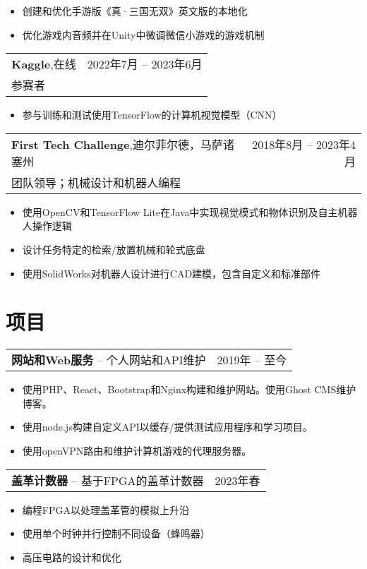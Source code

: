 \documentclass[oneside, 11pt]{article}
\newcommand*{\experienceEntry}[4]{
	\noindent
	\begin{tabularx}{\textwidth}{Xr}
	\textbf{#1},\quad #2 & #3\\
	#4 &
	\end{tabularx}
	\vspace{-0.75\baselineskip}
}
\newcommand*{\projectEntry}[3]{
	\noindent
	\begin{tabularx}{\textwidth}{Xr}
	\textbf{#1} -- #3 & #2
	\end{tabularx}
	\vspace{-1.25\baselineskip}
}
\newenvironment{expD}
	{\begin{itemize}[noitemsep,topsep=0pt]}
	{\end{itemize}}
\begin{document}
\begin{expD}
  \item 创建和优化手游版《真·三国无双》英文版的本地化
  \item 优化游戏内音频并在Unity中微调微信小游戏的游戏机制
\end{expD}

\experienceEntry{Kaggle}
  {在线}
  {2022年7月 -- 2023年6月}
  {参赛者}

\begin{expD}
  \item 参与训练和测试使用TensorFlow的计算机视觉模型（CNN）
\end{expD}

\experienceEntry{First Tech Challenge}
  {迪尔菲尔德，马萨诸塞州}
  {2018年8月 -- 2023年4月}
  {团队领导；机械设计和机器人编程}

\begin{expD}
  \item 使用OpenCV和TensorFlow Lite在Java中实现视觉模式和物体识别及自主机器人操作逻辑
  \item 设计任务特定的检索/放置机械和轮式底盘
  \item 使用SolidWorks对机器人设计进行CAD建模，包含自定义和标准部件
\end{expD}

\section*{项目}

\projectEntry{网站和Web服务}
  {2019年 -- 至今}
  {个人网站和API维护}

\begin{expD}
  \item 使用PHP、React、Bootstrap和Nginx构建和维护网站。使用Ghost CMS维护博客。
  \item 使用node.js构建自定义API以缓存/提供测试应用程序和学习项目。
  \item 使用openVPN路由和维护计算机游戏的代理服务器。
\end{expD}

\projectEntry{盖革计数器}
  {2023年春}
  {基于FPGA的盖革计数器}

\begin{expD}
  \item 编程FPGA以处理盖革管的模拟上升沿
  \item 使用单个时钟并行控制不同设备（蜂鸣器）
  \item 高压电路的设计和优化
\end{expD}
\end{document}
